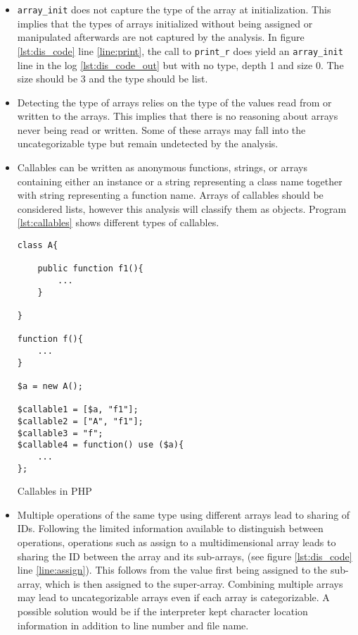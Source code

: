 \begin{itemize}
\item  \texttt{array\_init} does not capture the type of the array at initialization. This implies that the types of arrays initialized without being assigned or manipulated afterwards are not captured by the analysis. In figure \ref{lst:dis_code} line \ref{line:print}, the call to \texttt{print\_r} does yield an \texttt{array\_init} line in the log \ref{lst:dis_code_out} but with no type, depth 1 and size 0. The size should be 3 and the type should be list.

\item Detecting the type of arrays relies on the type of the values read from or written to the arrays. This implies that there is no reasoning about arrays never being read or written. Some of these arrays may fall into the uncategorizable type but remain undetected by the analysis.

\item Callables can be written as anonymous functions, strings, or arrays containing either an instance or a string representing a class name together with string representing a function name. Arrays of callables should be considered lists, however this analysis will classify them as objects. Program \ref{lst:callables} shows different types of callables.

\begin{program}
\centering
\begin{lstlisting}
class A{

    public function f1(){
        ...
    }

}

function f(){
    ...
}

$a = new A();

$callable1 = [$a, "f1"];
$callable2 = ["A", "f1"];
$callable3 = "f";
$callable4 = function() use ($a){
    ...
};
\end{lstlisting}
\caption{Callables in PHP}
\label{lst:callables}
\end{program}

\item Multiple operations of the same type using different arrays lead to sharing of IDs. Following the limited information available to distinguish between operations, operations such as assign to a multidimensional array leads to sharing the ID between the array and its sub-arrays, (see figure \ref{lst:dis_code} line \ref{line:assign}). This follows from the value first being assigned to the sub-array, which is then assigned to the super-array. Combining multiple arrays may lead to uncategorizable arrays even if each array is categorizable. A possible solution would be if the interpreter kept character location information in addition to line number and file name.   

\end{itemize}



